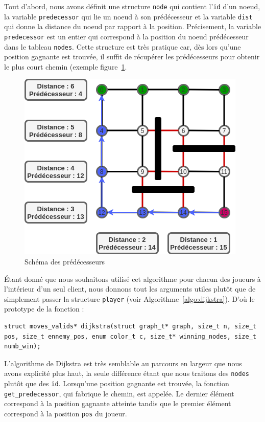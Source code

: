 \documentclass[a4paper]{article}
\begin{document}
Tout d'abord, nous avons définit une structure \texttt{node} qui contient l'\texttt{id} d'un noeud, la variable \texttt{predecessor} qui lie un noeud à son prédécesseur et la variable \texttt{dist} qui donne la distance du noeud par rapport à la position. Précisement, la variable \texttt{predecessor} est un entier qui correspond à la position du noeud prédécesseur dans le tableau \texttt{nodes}. Cette structure est très pratique car, dès lors qu'une position gagnante est trouvée, il suffit de récupérer les prédécesseurs pour obtenir le plus court chemin (exemple figure~\ref{fig:predecessor}. \\

\begin{figure}[ht]
    \centering
    \includegraphics[scale=0.7]{predecesseurs.png}
    \caption{Schéma des prédécesseurs}
    \label{fig:predecessor}
\end{figure}

Étant donné que nous souhaitons utilisé cet algorithme pour chacun des joueurs à l'intérieur d'un seul client, nous donnons tout les arguments utiles plutôt que de simplement passer la structure \texttt{player} (voir Algorithme~\ref{algo:dijkstra}). 
D'où le prototype de la fonction :

\begin{lstlisting}[caption = {Spécification de la fonction dijkstra}, label = {algo:dijkstra}, float = h]
struct moves_valids* dijkstra(struct graph_t* graph, size_t n, size_t pos, size_t ennemy_pos, enum color_t c, size_t* winning_nodes, size_t numb_win);
\end{lstlisting}

L'algorithme de Dijkstra est très semblable au parcours en largeur que nous avons explicité plus haut, la seule différence étant que nous traitons des \texttt{nodes} plutôt que des \texttt{id}. Lorsqu'une position gagnante est trouvée, la fonction \texttt{get\_predecessor}, qui fabrique le chemin, est appelée. Le dernier élément correspond à la position gagnante atteinte tandis que le premier élément correspond à la position \texttt{pos} du joueur. \\
\end{document}
